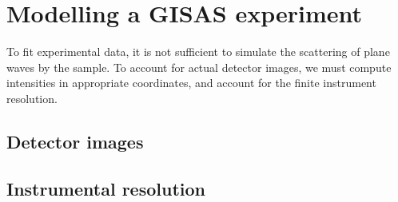 
\chapter{Modelling a GISAS experiment}  \label{sec:Exp}

To fit experimental data, it is not sufficient to simulate
the scattering of plane waves by the sample.
To account for actual detector images,
we must compute intensities in appropriate coordinates,
and account for the finite instrument resolution.

\section{Detector images}\label{Sdetimg}



\MissingSection

\section{Instrumental resolution}\label{Sresolution}

\MissingSection
